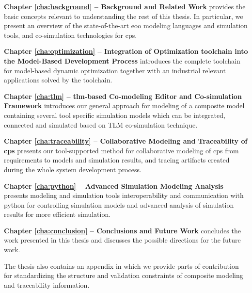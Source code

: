 \begin{description}
	
\item \textbf{Chapter \ref{cha:background} – Background and Related Work } provides the basic concepts relevant to understanding the rest of this thesis.  In particular, we present an overview of the state-of-the-art \acrshort{eoo} modeling languages and simulation tools, and co-simulation technologies for \acrshort{cps}. 

\item \textbf{Chapter \ref{cha:optimization} – Integration of Optimization toolchain into the Model-Based Development Process} introduces the complete toolchain for model-based dynamic optimization together with an industrial relevant applications solved by the toolchain.

\item \textbf{Chapter \ref{cha:tlm} – \acrshort{tlm}-based Co-modeling Editor and Co-simulation Framework} introduces our general approach for modeling of a composite model containing several tool specific simulation models which can be integrated, connected and simulated based on TLM co-simulation technique.

\item \textbf{Chapter \ref{cha:traceability} – Collaborative Modeling and Traceability of \acrshort{cps}} presents our tool-supported method for collaborative modeling of \acrshort{cps} from requirements to models and simulation results, and tracing artifacts created during the whole system development process.

\item \textbf{Chapter \ref{cha:python} – Advanced Simulation Modeling Analysis} presents modeling and simulation tools interoperability and communication with python for controlling simulation models and advanced analysis of simulation results for more efficient simulation.

\item \textbf{Chapter \ref{cha:conclusion} – Conclusions and Future Work} concludes the work presented in this thesis and discusses the possible directions for the future work.

\end{description}

The thesis also contains an appendix in which we provide parts of contribution for standardizing the structure and validation constraints of composite modeling and traceability information.




